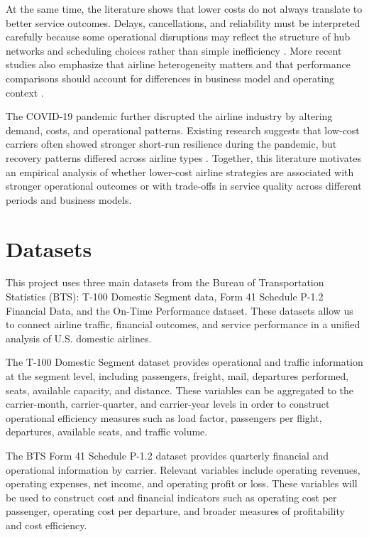 \documentclass[11pt, letterpaper]{article}
\begin{document}
At the same time, the literature shows that lower costs do not always translate to better service outcomes. Delays, cancellations, and reliability must be interpreted carefully because some operational disruptions may reflect the structure of hub networks and scheduling choices rather than simple inefficiency \cite{mayer2002, lee2023}. More recent studies also emphasize that airline heterogeneity matters and that performance comparisons should account for differences in business model and operating context \cite{li2025, nguyen2022}. 

The COVID-19 pandemic further disrupted the airline industry by altering demand, costs, and operational patterns. Existing research suggests that low-cost carriers often showed stronger short-run resilience during the pandemic, but recovery patterns differed across airline types \cite{fontanet2022, gudmundsson2021}. Together, this literature motivates an empirical analysis of whether lower-cost airline strategies are associated with stronger operational outcomes or with trade-offs in service quality across different periods and business models.

\section{Datasets}

This project uses three main datasets from the Bureau of Transportation Statistics (BTS): T-100 Domestic Segment data, Form 41 Schedule P-1.2 Financial Data, and the On-Time Performance dataset. These datasets allow us to connect airline traffic, financial outcomes, and service performance in a unified analysis of U.S. domestic airlines.

The T-100 Domestic Segment dataset provides operational and traffic information at the segment level, including passengers, freight, mail, departures performed, seats, available capacity, and distance. These variables can be aggregated to the carrier-month, carrier-quarter, and carrier-year levels in order to construct operational efficiency measures such as load factor, passengers per flight, departures, available seats, and traffic volume.

The BTS Form 41 Schedule P-1.2 dataset provides quarterly financial and operational information by carrier. Relevant variables include operating revenues, operating expenses, net income, and operating profit or loss. These variables will be used to construct cost and financial indicators such as operating cost per passenger, operating cost per departure, and broader measures of profitability and cost efficiency.
\end{document}
